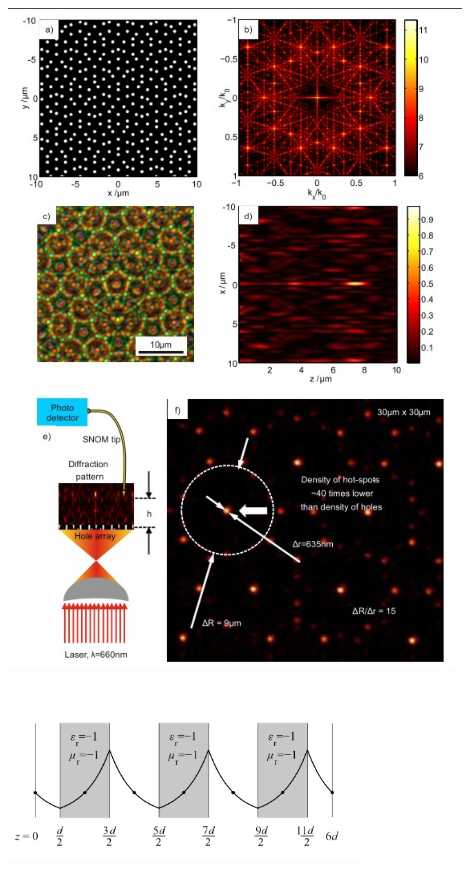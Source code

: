 \documentclass[9pt, compress, xcolor=table]{beamer}
\begin{document}
\begin{frame}[fragile]
\begin{columns}[c]
\begin{center}
\includegraphics[width=0.9\textwidth]{array_lense1}
\end{center}
\end{columns}

\begin{center}
\includegraphics[width=0.7\textwidth]{neg_ref_40b}
\end{center}

\end{frame}
\end{document}
